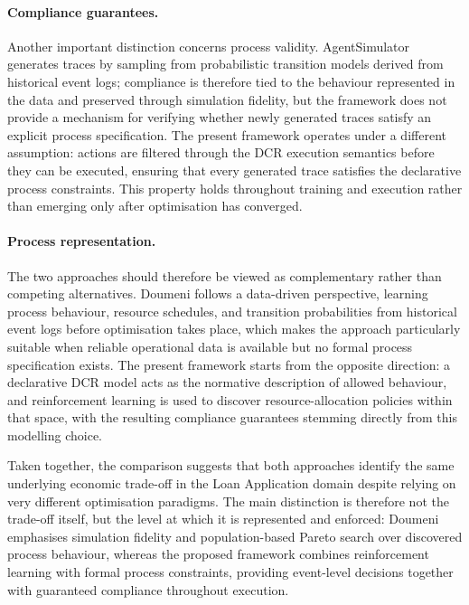 \paragraph{Compliance guarantees.} Another important distinction concerns process validity. AgentSimulator generates traces by sampling from probabilistic transition models derived from historical event logs; compliance is therefore tied to the behaviour represented in the data and preserved through simulation fidelity, but the framework does not provide a mechanism for verifying whether newly generated traces satisfy an explicit process specification. The present framework operates under a different assumption: actions are filtered through the \ac{DCR} execution semantics before they can be executed, ensuring that every generated trace satisfies the declarative process constraints. This property holds throughout training and execution rather than emerging only after optimisation has converged.

\paragraph{Process representation.} The two approaches should therefore be viewed as complementary rather than competing alternatives. Doumeni follows a data-driven perspective, learning process behaviour, resource schedules, and transition probabilities from historical event logs before optimisation takes place, which makes the approach particularly suitable when reliable operational data is available but no formal process specification exists. The present framework starts from the opposite direction: a declarative \ac{DCR} model acts as the normative description of allowed behaviour, and reinforcement learning is used to discover resource-allocation policies within that space, with the resulting compliance guarantees stemming directly from this modelling choice.

Taken together, the comparison suggests that both approaches identify the same underlying economic trade-off in the Loan Application domain despite relying on very different optimisation paradigms. The main distinction is therefore not the trade-off itself, but the level at which it is represented and enforced: Doumeni emphasises simulation fidelity and population-based Pareto search over discovered process behaviour, whereas the proposed framework combines reinforcement learning with formal process constraints, providing event-level decisions together with guaranteed compliance throughout execution.

